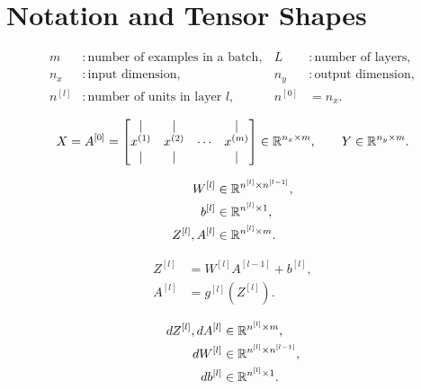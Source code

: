 \section{Notation and Tensor Shapes}

\[
\begin{aligned}
m &: \text{number of examples in a batch}, &
L &: \text{number of layers},\\
n_x &: \text{input dimension}, &
n_y &: \text{output dimension},\\
n^{[l]} &: \text{number of units in layer } l, &
n^{[0]} &= n_x.
\end{aligned}
\]

\[
X = A^{[0]} =
\begin{bmatrix}
| & | & & |\\
x^{(1)} & x^{(2)} & \cdots & x^{(m)}\\
| & | & & |
\end{bmatrix}
\in \mathbb{R}^{n_x \times m},
\qquad
Y \in \mathbb{R}^{n_y \times m}.
\]

\[
\begin{aligned}
W^{[l]} &\in \mathbb{R}^{n^{[l]} \times n^{[l-1]}},\\
b^{[l]} &\in \mathbb{R}^{n^{[l]} \times 1},\\
Z^{[l]}, A^{[l]} &\in \mathbb{R}^{n^{[l]} \times m}.
\end{aligned}
\]

\[
\begin{aligned}
Z^{[l]} &= W^{[l]} A^{[l-1]} + b^{[l]},\\
A^{[l]} &= g^{[l]}(Z^{[l]}).
\end{aligned}
\]

\[
\begin{aligned}
dZ^{[l]}, dA^{[l]} &\in \mathbb{R}^{n^{[l]} \times m},\\
dW^{[l]} &\in \mathbb{R}^{n^{[l]} \times n^{[l-1]}},\\
db^{[l]} &\in \mathbb{R}^{n^{[l]} \times 1}.
\end{aligned}
\]

